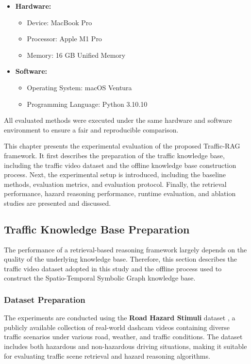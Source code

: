\documentclass[a4paper, 11pt]{article} %
\begin{document}
\begin{itemize}
    \item \textbf{Hardware:}
    \begin{itemize}
        \item Device: MacBook Pro
        \item Processor: Apple M1 Pro
        \item Memory: 16 GB Unified Memory
    \end{itemize}

    \item \textbf{Software:}
    \begin{itemize}
        \item Operating System: macOS Ventura
        \item Programming Language: Python 3.10.10
    \end{itemize}
\end{itemize}

All evaluated methods were executed under the same hardware and software environment to ensure a fair and reproducible comparison.

This chapter presents the experimental evaluation of the proposed Traffic-RAG framework. It first describes the preparation of the traffic knowledge base, including the traffic video dataset and the offline knowledge base construction process. Next, the experimental setup is introduced, including the baseline methods, evaluation metrics, and evaluation protocol. Finally, the retrieval performance, hazard reasoning performance, runtime evaluation, and ablation studies are presented and discussed.
\subsection{Traffic Knowledge Base Preparation}

The performance of a retrieval-based reasoning framework largely depends on the quality of the underlying knowledge base. Therefore, this section describes the traffic video dataset adopted in this study and the offline process used to construct the Spatio-Temporal Symbolic Graph knowledge base.

\subsubsection{Dataset Preparation }

The experiments are conducted using the \textbf{Road Hazard Stimuli} dataset \cite{song2024road}, a publicly available collection of real-world dashcam videos containing diverse traffic scenarios under various road, weather, and traffic conditions. The dataset includes both hazardous and non-hazardous driving situations, making it suitable for evaluating traffic scene retrieval and hazard reasoning algorithms.
\end{document}
